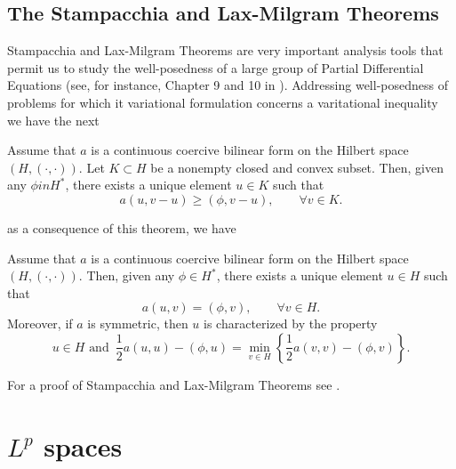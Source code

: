 \subsection*{The Stampacchia and Lax-Milgram Theorems}
Stampacchia and Lax-Milgram Theorems are very important analysis tools that permit us to study the well-posedness of a large group of Partial Differential Equations (see, for instance, Chapter 9 and 10 in \cite{brezis2011}). Addressing well-posedness of problems for which it variational formulation concerns a varitational inequality we have the next
\begin{theorem}[Stampacchia]Assume that $a$ is a continuous coercive bilinear form on the Hilbert space $(H,(\cdot,\cdot))$. Let $K\subset H$ be a nonempty closed and convex subset. Then, given any $\phi in H^*$, there exists a unique element $u\in K$ such that
\begin{equation}
	a(u,v-u)\geq \left( \phi,v-u\right),\qquad \forall v \in K.
\end{equation}
\end{theorem}
as a consequence of this theorem, we have
\begin{corollary}Assume that $a$ is a continuous coercive bilinear form on the Hilbert space $(H,(\cdot,\cdot))$. Then, given any $\phi\in H^*$, there exists a unique element $u\in H$ such that
\begin{equation}
a(u,v)=\left(\phi,v\right),\qquad \forall v\in H.
\end{equation}
Moreover, if $a$ is symmetric, then $u$ is characterized by the property
\begin{equation*}
u\in H \text{ and }\,\frac{1}{2}a(u,u)-\left(\phi,u\right)=\min_{v\in H}\left\{\frac{1}{2}a(v,v)-(\phi,v)\right\}.
\end{equation*}
\end{corollary}
For a proof of Stampacchia and Lax-Milgram Theorems see \cite{brezis2011}.
\section{$L^p$ spaces}
